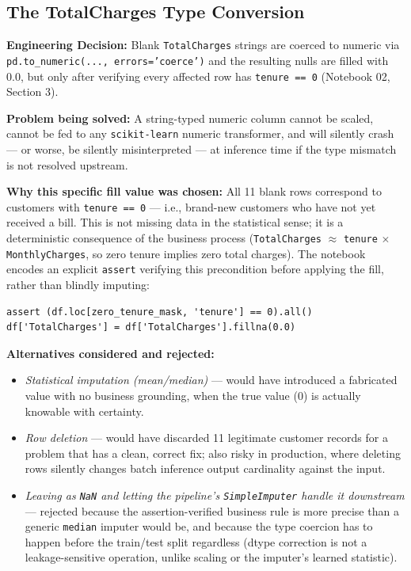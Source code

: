 \documentclass[11pt]{article}
\newcommand{\decision}[1]{%
\begin{decisionbox}
\textbf{\color{navy}Engineering Decision:} #1
\end{decisionbox}
}
\newcommand{\artifact}[1]{\texttt{\color{navy}#1}}
\begin{document}
\subsection{The TotalCharges Type Conversion}
\label{sec:totalcharges}

\decision{Blank \artifact{TotalCharges} strings are coerced to numeric via \texttt{pd.to\_numeric(..., errors='coerce')} and the resulting nulls are filled with $0.0$, but only after verifying every affected row has \texttt{tenure == 0} (Notebook 02, Section 3).}

\textbf{Problem being solved:} A string-typed numeric column cannot be scaled, cannot be fed to any \texttt{scikit-learn} numeric transformer, and will silently crash --- or worse, be silently misinterpreted --- at inference time if the type mismatch is not resolved upstream.

\textbf{Why this specific fill value was chosen:} All 11 blank rows correspond to customers with \texttt{tenure == 0} --- i.e., brand-new customers who have not yet received a bill. This is not missing data in the statistical sense; it is a deterministic consequence of the business process (\artifact{TotalCharges} $\approx$ \artifact{tenure} $\times$ \artifact{MonthlyCharges}, so zero tenure implies zero total charges). The notebook encodes an explicit \texttt{assert} verifying this precondition before applying the fill, rather than blindly imputing:
\begin{lstlisting}
assert (df.loc[zero_tenure_mask, 'tenure'] == 0).all()
df['TotalCharges'] = df['TotalCharges'].fillna(0.0)
\end{lstlisting}

\textbf{Alternatives considered and rejected:}
\begin{itemize}[leftmargin=1.4em]
    \item \emph{Statistical imputation (mean/median)} --- would have introduced a fabricated value with no business grounding, when the true value (0) is actually knowable with certainty.
    \item \emph{Row deletion} --- would have discarded 11 legitimate customer records for a problem that has a clean, correct fix; also risky in production, where deleting rows silently changes batch inference output cardinality against the input.
    \item \emph{Leaving as \texttt{NaN} and letting the pipeline's \texttt{SimpleImputer} handle it downstream} --- rejected because the assertion-verified business rule is more precise than a generic \texttt{median} imputer would be, and because the type coercion has to happen before the train/test split regardless (dtype correction is not a leakage-sensitive operation, unlike scaling or the imputer's learned statistic).
\end{itemize}
\end{document}
